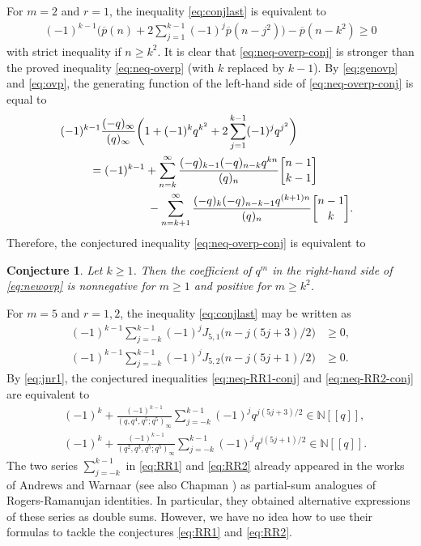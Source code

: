 \documentclass[12pt]{article}
\newtheorem{conj}[thm]{Conjecture}
\theoremstyle{remark}
\def\N{{\mathbb N}}
\numberwithin{equation}{section}
\begin{document}
For $m=2$ and $r=1$,
the inequality \eqref{eq:conjlast} is equivalent to
\begin{align}
(-1)^{k-1} \bigg(\overline{p}(n)
+2\sum_{j=1}^{k-1} (-1)^{j}\overline{p}(n-j^2) \bigg)- \overline{p}(n-k^2)\geqslant 0  \label{eq:neq-overp-conj}
\end{align}
with strict inequality if $n\geqslant k^2$.
It is clear that \eqref{eq:neq-overp-conj} is stronger than the proved inequality
\eqref{eq:neq-overp} (with $k$ replaced by $k-1$).
By \eqref{eq:genovp} and \eqref{eq:ovp},  the generating function of the left-hand side of \eqref{eq:neq-overp-conj} is equal to
\begin{align}
&\hskip -2mm
(-1)^{k-1}\frac{(-q)_\infty}{(q)_\infty}\bigg(1+(-1)^{k} q^{k^2}
+2\sum_{j=1}^{k-1} (-1)^j q^{j^2}\bigg)\nonumber \\
&\qquad =(-1)^{k-1} +\sum_{n=k}^\infty
\frac{(-q)_{k-1} (-q)_{n-k}q^{kn}}{(q)_n}{n-1\brack k-1} \nonumber \\
&\hspace{2.5cm} -\sum_{n=k+1}^\infty\frac{(-q)_{k} (-q)_{n-k-1}q^{(k+1)n}}{(q)_n}{n-1\brack k}. \label{eq:newovp}
\end{align}
Therefore, the conjectured inequality \eqref{eq:neq-overp-conj} is equivalent to
\begin{conj} Let $k\geqslant 1$. Then
the coefficient of $q^m$ in the right-hand side of \eqref{eq:newovp} is nonnegative   for $m\geqslant 1$ and  positive for $m\geqslant k^2$.
\end{conj}

For $m=5$ and $r=1,2$,
the  inequality \eqref{eq:conjlast} may be written as
\begin{align}
(-1)^{k-1}\sum_{j=-k}^{k-1} (-1)^{j} J_{5,1}\bigl(n-j(5j+3)/2\bigr)
&\geqslant 0,   \label{eq:neq-RR1-conj} \\
(-1)^{k-1}\sum_{j=-k}^{k-1} (-1)^{j} J_{5,2}\bigl(n-j(5j+1)/2\bigr)
&\geqslant 0.  \label{eq:neq-RR2-conj}
\end{align}
By \eqref{eq:jnr1}, the conjectured inequalities
\eqref{eq:neq-RR1-conj} and \eqref{eq:neq-RR2-conj} are equivalent to
\begin{align}\label{eq:RR1}
&(-1)^k+\frac{(-1)^{k-1}}{(q,q^4,q^5;q^5)_\infty} \sum_{j=-k}^{k-1} (-1)^{j} q^{j(5j+3)/2}\in \N[[q]], \\
&(-1)^k+\frac{(-1)^{k-1}}{(q^2,q^3,q^5;q^5)_\infty} \sum_{j=-k}^{k-1} (-1)^{j} q^{j(5j+1)/2}\in \N[[q]].  \label{eq:RR2}
\end{align}
The two series $\sum_{j=-k}^{k-1}$  in \eqref{eq:RR1} and \eqref{eq:RR2} already appeared in
the works of Andrews \cite{Andrews83} and  Warnaar \cite{Warnaar}
(see also Chapman \cite{Chapman})
as  partial-sum analogues of Rogers-Ramanujan identities.  In particular, they obtained alternative expressions  of these series as double sums.
However, we have no idea  how to use  their formulas  to tackle the conjectures \eqref{eq:RR1} and \eqref{eq:RR2}.
\end{document}
